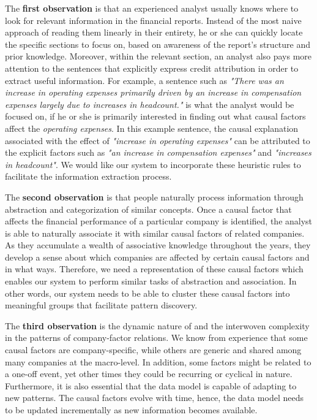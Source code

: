 \documentclass [
     12pt,         %
     a4paper,      %
     BCOR10mm,     %
     DIV14,        %
     liststotoc,   %
     bibtotoc,     %
     idxtotoc,     %
     parskip       %
     ]{scrreprt}
\begin{document}
The \textbf{first observation} is that an experienced analyst usually knows where to look for relevant information in the financial reports. Instead of the most naive approach of reading them linearly in their entirety, he or she can quickly locate the specific sections to focus on, based on awareness of the report's structure and prior knowledge. Moreover, within the relevant section, an analyst also pays more attention to the sentences that explicitly express credit attribution in order to extract useful information. For example, a sentence such as \emph{"There was an increase in operating expenses primarily driven by an increase in compensation expenses largely due to increases in headcount."} is what the analyst would be focused on, if he or she is primarily interested in finding out what causal factors affect the \emph{operating expenses}. In this example sentence, the causal explanation associated with the effect of \emph{"increase in operating expenses"} can be attributed to the explicit factors such as \emph{"an increase in compensation expenses"} and \emph{"increases in headcount"}. We would like our system to incorporate these heuristic rules to facilitate the information extraction process.

The \textbf{second observation} is that people naturally process information through abstraction and categorization of similar concepts. Once a causal factor that affects the financial performance of a particular company is identified, the analyst is able to naturally associate it with similar causal factors of related companies. As they accumulate a wealth of associative knowledge throughout the years, they develop a sense about which companies are affected by certain causal factors and in what ways. Therefore, we need a representation of these causal factors which enables our system to perform similar tasks of abstraction and association. In other words, our system needs to be able to cluster these causal factors into meaningful groups that facilitate pattern discovery.

The \textbf{third observation} is the dynamic nature of and the interwoven complexity in the patterns of company-factor relations. We know from experience that some causal factors are company-specific, while others are generic and shared among many companies at the macro-level. In addition, some factors might be related to a one-off event, yet other times they could be recurring or cyclical in nature. Furthermore, it is also essential that the data model is capable of adapting to new patterns. The causal factors evolve with time, hence, the data model needs to be updated incrementally as new information becomes available.
  
\end{document}

